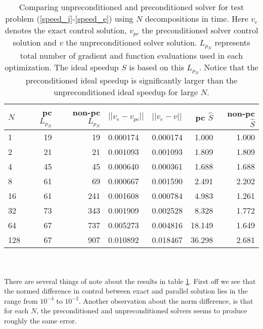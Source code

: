 \begin{table}[h]
\centering
\caption{Comparing unpreconditioned and preconditioned solver for test problem (\ref{speed_j}-\ref{speed_e}) using $N$ decompositions in time. Here $v_e$ denotes the exact control solution, $v_{pc}$ the preconditioned solver control solution and $v$ the unpreconditioned solver solution. $L_{p_N}$ represents total number of gradient and function evaluations used in each optimization. The ideal speedup $\hat S$ is based on this $L_{p_N}$. Notice that the preconditioned ideal speedup is significantly larger than the unpreconditioned ideal speedup for large $N$.}
\label{compare_table}
\begin{tabular}{lrrllrr}
\toprule
{}$N$ &  pc $L_{p_N}$ &  non-pc $L_{p_N}$ &       $||v_e-v_{pc}||$ &  $||v_e-v||$  &  pc $\hat{S}$ &  non-pc $\hat{S}$ \\
\midrule
1   &     19 &      19 &  0.000174 &    0.000174 &    1.000 &        1.000 \\
2   &     21 &      21 &  0.001093 &    0.001093 &    1.809 &        1.809 \\
4   &     45 &      45 &  0.000640 &    0.000361 &    1.688 &        1.688 \\
8   &     61 &      69 &  0.000667 &    0.001590 &    2.491 &        2.202 \\
16  &     61 &     241 &  0.001608 &    0.000784 &    4.983 &        1.261 \\
32  &     73 &     343 &  0.001909 &    0.002528 &    8.328 &        1.772 \\
64  &     67 &     737 &  0.005273 &    0.004816 &   18.149 &        1.649 \\
128 &     67 &     907 &  0.010892 &    0.018467 &   36.298 &        2.681 \\
\bottomrule
\end{tabular}
\end{table}
\\
\\
There are several things of note about the results in table \ref{compare_table}. First off we see that the normed difference in control between exact and parallel solution lies in the range from $10^{-4}$ to $10^{-2}$. Another observation about the norm difference, is that for each $N$, the preconditioned and unpreconditioned solvers seems to produce roughly the same error. 
\\
\\
